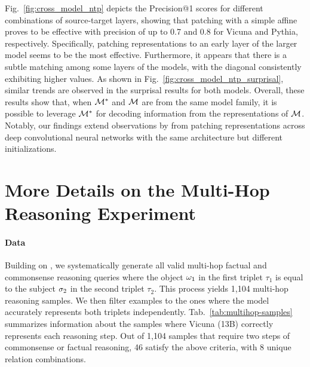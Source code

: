 \documentclass{article}
\theoremstyle{plain}
\theoremstyle{definition}
\theoremstyle{remark}
\begin{document}
Fig.~\ref{fig:cross_model_ntp} depicts the Precision@1 scores for different combinations of source-target layers, showing that patching with a simple affine \methodName{} proves to be effective with precision of up to 0.7 and 0.8 for Vicuna and Pythia, respectively. Specifically, patching representations to an early layer of the larger model seems to be the most effective.
Furthermore, it appears that there is a subtle matching among some layers of the models, with the diagonal consistently exhibiting higher values. 
As shown in Fig.~\ref{fig:cross_model_ntp_surprisal}, similar trends are observed in the surprisal results for both models. Overall, these results show that, when $\mathcal{M}^*$ and $\mathcal{M}$ are from the same model family, it is possible to leverage $\mathcal{M}^*$ for decoding information from the representations of $\mathcal{M}$. Notably, our findings extend observations by \citet{csiszarik2021similarity} from patching representations across deep convolutional neural networks with the same architecture but different initializations.


\section{More Details on the Multi-Hop Reasoning Experiment}
\label{sec:appendix-cot}

\paragraph{Data} Building on \citet{hernandez2023linearity}, we systematically generate all valid multi-hop factual and commonsense reasoning queries where the object $\omega_1$ in the first triplet $\tau_1$ is equal to the subject $\sigma_2$ in the second triplet $\tau_2$. This process yields 1,104 multi-hop reasoning samples. We then filter examples to the ones where the model accurately represents both triplets independently. Tab.~\ref{tab:multihop-samples} summarizes information about the samples where Vicuna (13B) correctly represents each reasoning step. Out of 1,104 samples that require two steps of commonsense or factual reasoning, 46 satisfy the above criteria, with 8 unique relation combinations.
\end{document}
